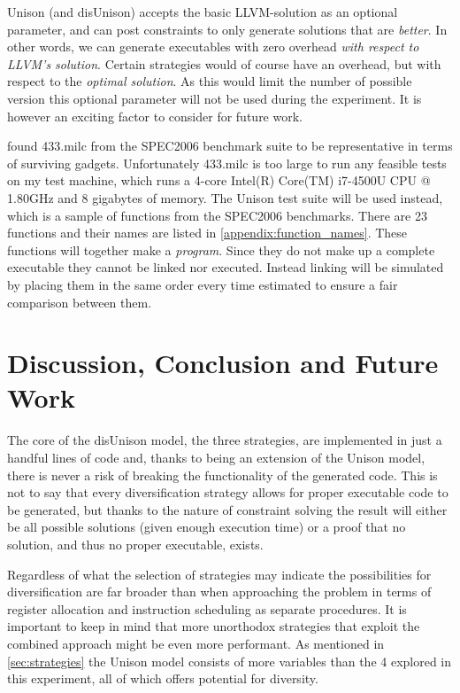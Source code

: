 
Unison (and disUnison) accepts the basic LLVM-solution as an optional parameter, and can
post constraints to only generate solutions that are \textit{better}. In other words, we
can generate executables with zero overhead \textit{with respect to LLVM's solution}.
Certain strategies would of course have an overhead, but with respect to the
\textit{optimal solution}. As this would limit the number of possible version this
optional parameter will not be used during the experiment. It is however an exciting
factor to consider for future work.

\textcite{large-scale-automated} found 433.milc from the SPEC2006 benchmark suite to be
representative in terms of surviving gadgets. Unfortunately 433.milc is too large to run
any feasible tests on my test machine, which runs a 4-core Intel(R) Core(TM) i7-4500U CPU
@ 1.80GHz and 8 gigabytes of memory. The Unison test suite will be used instead, which is
a sample of functions from the SPEC2006 benchmarks. There are 23 functions and their names
are listed in \ref{appendix:function_names}. These functions will together make a
\textit{program}. Since they do not make up a complete executable they cannot be linked
nor executed. Instead linking will be simulated by placing them in the same order every time
estimated to ensure a fair comparison between them.

\chapter{Discussion, Conclusion and Future Work}

The core of the disUnison model, the three strategies, are implemented in just a handful
lines of code and, thanks to being an extension of the Unison model, there is never a risk
of breaking the functionality of the generated code. This is not to say that every
diversification strategy allows for proper executable code to be generated, but thanks to
the nature of constraint solving the result will either be all possible solutions
(given enough execution time) or a proof that no solution, and thus no proper executable,
exists.

Regardless of what the selection of strategies may indicate the possibilities for
diversification are far broader than when approaching the problem in terms of register
allocation and instruction scheduling as separate procedures. It is important to keep in
mind that more unorthodox strategies that exploit the combined approach might be even
more performant. As mentioned in \ref{sec:strategies} the Unison model consists of more
variables than the 4 explored in this experiment, all of which offers potential for
diversity.

